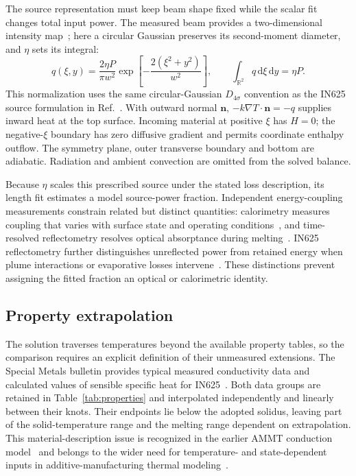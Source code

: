 \documentclass[preprint,12pt]{elsarticle}
\begin{document}
The source representation must keep beam shape fixed while the scalar fit changes total input power. The measured beam provides a two-dimensional intensity map~\cite{lane2020}; here a circular Gaussian preserves its second-moment diameter, and $\eta$ sets its integral:
\begin{equation}
 q(\xi,y)=\frac{2\eta P}{\pi w^2}
 \exp\!\left[-\frac{2(\xi^2+y^2)}{w^2}\right],\qquad
 \int_{\mathbb R^2}q\,\mathrm d\xi\,\mathrm dy=\eta P.
 \label{eq:source}
\end{equation}
This normalization uses the same circular-Gaussian $D_{4\sigma}$ convention as the IN625 source formulation in Ref.~\cite{dynamic2024}. With outward normal $\bm n$, $-k\nabla T\cdot\bm n=-q$ supplies inward heat at the top surface. Incoming material at positive $\xi$ has $H=0$; the negative-$\xi$ boundary has zero diffusive gradient and permits coordinate enthalpy outflow. The symmetry plane, outer transverse boundary and bottom are adiabatic. Radiation and ambient convection are omitted from the solved balance.

Because $\eta$ scales this prescribed source under the stated loss description, its length fit estimates a model source-power fraction. Independent energy-coupling measurements constrain related but distinct quantities: calorimetry measures coupling that varies with surface state and operating conditions~\cite{trapp2017}, and time-resolved reflectometry resolves optical absorptance during melting~\cite{simonds2018}. IN625 reflectometry further distinguishes unreflected power from retained energy when plume interactions or evaporative losses intervene~\cite{lane2020absorption}. These distinctions prevent assigning the fitted fraction an optical or calorimetric identity.

\subsection{Property extrapolation}
\label{sec:property-extrapolation}
The solution traverses temperatures beyond the available property tables, so the comparison requires an explicit definition of their unmeasured extensions. The Special Metals bulletin provides typical measured conductivity data and calculated values of sensible specific heat for IN625~\cite{specialmetals625}. Both data groups are retained in Table~\ref{tab:properties} and interpolated independently and linearly between their knots. Their endpoints lie below the adopted solidus, leaving part of the solid-temperature range and the melting range dependent on extrapolation. This material-description issue is recognized in the earlier AMMT conduction model~\cite{kollmannsberger2019} and belongs to the wider need for temperature- and state-dependent inputs in additive-manufacturing thermal modeling~\cite{review2024}.
\end{document}
